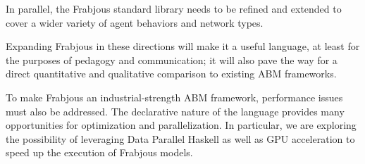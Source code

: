 \documentclass[oribibl]{llncs}
\begin{document}
In parallel, the Frabjous standard library needs to be refined and extended to cover a wider variety of agent behaviors and network types. 

Expanding Frabjous in these directions will make it a useful language, at least for the purposes of pedagogy and communication; it will also pave the way for a direct quantitative and qualitative comparison to existing ABM frameworks.

To make Frabjous an industrial-strength ABM framework, performance issues must also be addressed. The declarative nature of the language provides many opportunities for optimization and parallelization. In particular, we are exploring the possibility of leveraging Data Parallel Haskell\cite{dphaskell} as well as GPU acceleration\cite{accelerate} to speed up the execution of Frabjous models. 
   








%
\end{document}
